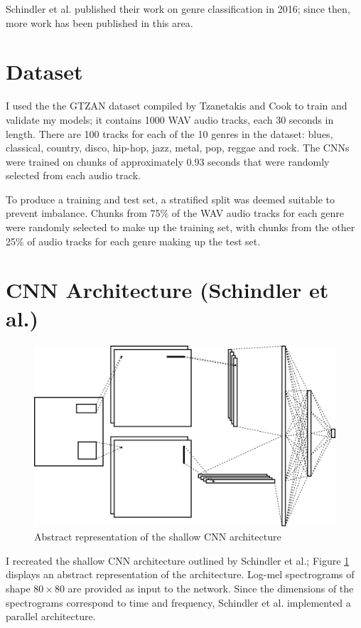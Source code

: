 \documentclass[conference]{IEEEtran}
\begin{document}
Schindler et al. published their work on genre classification in 2016; since then, more work has been published in this area.




\section{Dataset}

I used the the GTZAN dataset compiled by Tzanetakis and Cook \cite{TzanetakisCook} to train and validate my models; it contains 1000 WAV audio tracks, each 30 seconds in length.
There are 100 tracks for each of the 10 genres in the dataset: blues, classical, country, disco, hip-hop, jazz, metal, pop, reggae and rock.
The CNNs were trained on chunks of approximately 0.93 seconds that were randomly selected from each audio track.

To produce a training and test set, a stratified split was deemed suitable to prevent imbalance.
Chunks from 75\% of the WAV audio tracks for each genre were randomly selected to make up the training set, with chunks from the other 25\% of audio tracks for each genre making up the test set.

\section{CNN Architecture (Schindler et al.)}

\begin{figure}[htbp]
    \centerline{\includegraphics[width=\columnwidth]{architecture.jpg}}
    \caption{Abstract representation of the shallow CNN architecture}
    \label{architecture}
\end{figure}

I recreated the shallow CNN architecture outlined by Schindler et al.; Figure \ref{architecture} displays an abstract representation of the architecture.
Log-mel spectrograms of shape $80\times80$ are provided as input to the network.
Since the dimensions of the spectrograms correspond to time and frequency, Schindler et al. implemented a parallel architecture.
\end{document}

